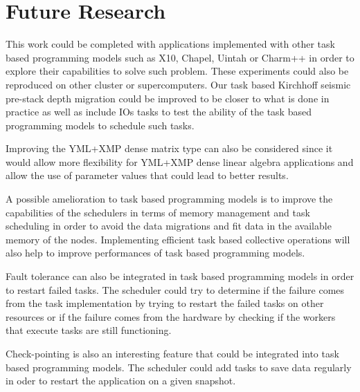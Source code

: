 \section{Future Research}

This work could be completed with applications implemented with other task based programming models such as X10, Chapel, Uintah or Charm++ in order to explore their capabilities to solve such problem.
These experiments could also be reproduced on other cluster or supercomputers.
Our task based Kirchhoff seismic pre-stack depth migration could be improved to be closer to what is done in practice as well as include IOs tasks to test the ability of the task based programming models to schedule such tasks.

Improving the YML+XMP dense matrix type can also be considered since it would allow more flexibility for YML+XMP dense linear algebra applications and allow the use of parameter values that could lead to better results.

A possible amelioration to task based programming models is to improve the capabilities of the schedulers in terms of memory management and task scheduling in order to avoid the data migrations and fit data in the available memory of the nodes.
Implementing efficient task based collective operations will also help to improve performances of task based programming models.

Fault tolerance can also be integrated in task based programming models in order to restart failed tasks.
The scheduler could try to determine if the failure comes from the task implementation by trying to restart the failed tasks on other resources or if the failure comes from the hardware by checking if the workers that execute tasks are still functioning.

Check-pointing is also an interesting feature that could be integrated into task based programming models.
The scheduler could add tasks to save data regularly in oder to restart the application on a given snapshot.
